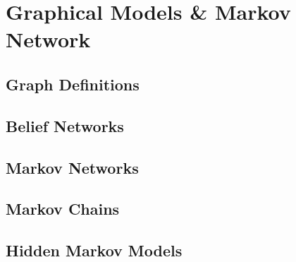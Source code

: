 
\chapter{Graphical Models \& Markov Network}
\label{chapter10}

\section{Graph Definitions}

\section{Belief Networks}

\section{Markov Networks}

\section{Markov Chains}

\section{Hidden Markov Models}